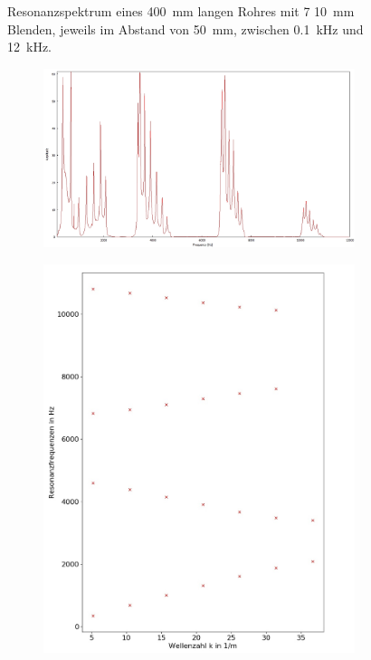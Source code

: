 \begin{figure}
\begin{subfigure}{0.34\textwidth}
\end{subfigure}
\caption{Resonanzspektrum eines 400~mm langen Rohres mit 7 10~mm Blenden, jeweils im Abstand von 50~mm, zwischen 0.1~kHz und 12~kHz.}
\label{fig:4_3_10}
\end{figure}
\begin{figure}
\centering
\begin{subfigure}{0.65\textwidth}
\includegraphics[width=\textwidth]{content/messungen/Chapter4/4_3_13mm.jpg}
\end{subfigure}
\begin{subfigure}{0.34\textwidth}
\includegraphics[width=\textwidth]{content/Scripts/4_3_13_red.jpg}

\end{subfigure}
\end{figure}
